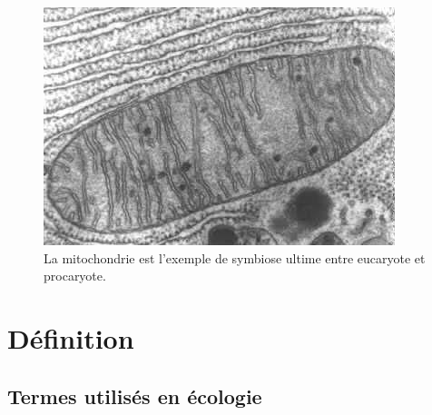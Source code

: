 \documentclass[12pt,a4paper]{article}
\begin{document}
\begin{figure}[ht]
\begin{center}
\includegraphics[scale=0.5]{img/mitochondrie.jpg}\hfill
\end{center}
\caption{La mitochondrie est l'exemple de symbiose ultime entre eucaryote et procaryote.}
\label{mitochondrie}
\end{figure}



\newpage

\section{Définition}
\subsection{Termes utilisés en écologie}
\end{document}
